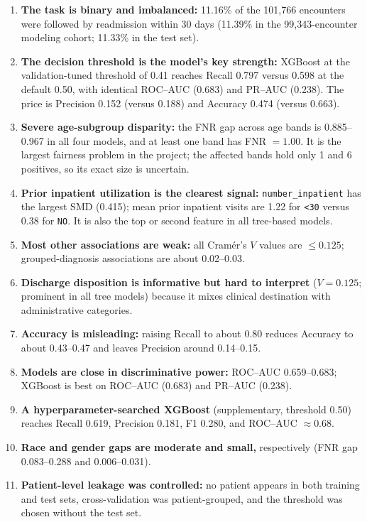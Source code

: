 \documentclass[10pt,a4paper]{article}
\begin{document}
\begin{enumerate}[leftmargin=1.2cm]
\item \textbf{The task is binary and imbalanced:} 11.16\% of the 101,766 encounters were followed by readmission within 30 days (11.39\% in the 99,343-encounter modeling cohort; 11.33\% in the test set).
\item \textbf{The decision threshold is the model's key strength:} XGBoost at the validation-tuned threshold of 0.41 reaches Recall 0.797 versus 0.598 at the default 0.50, with identical ROC--AUC (0.683) and PR--AUC (0.238). The price is Precision 0.152 (versus 0.188) and Accuracy 0.474 (versus 0.663).
\item \textbf{Severe age-subgroup disparity:} the FNR gap across age bands is 0.885--0.967 in all four models, and at least one band has FNR $=1.00$. It is the largest fairness problem in the project; the affected bands hold only 1 and 6 positives, so its exact size is uncertain.
\item \textbf{Prior inpatient utilization is the clearest signal:} \texttt{number\_inpatient} has the largest SMD (0.415); mean prior inpatient visits are 1.22 for \texttt{<30} versus 0.38 for \texttt{NO}. It is also the top or second feature in all tree-based models.
\item \textbf{Most other associations are weak:} all Cramér's $V$ values are $\le 0.125$; grouped-diagnosis associations are about 0.02--0.03.
\item \textbf{Discharge disposition is informative but hard to interpret} ($V=0.125$; prominent in all tree models) because it mixes clinical destination with administrative categories.
\item \textbf{Accuracy is misleading:} raising Recall to about 0.80 reduces Accuracy to about 0.43--0.47 and leaves Precision around 0.14--0.15.
\item \textbf{Models are close in discriminative power:} ROC--AUC 0.659--0.683; XGBoost is best on ROC--AUC (0.683) and PR--AUC (0.238).
\item \textbf{A hyperparameter-searched XGBoost} (supplementary, threshold 0.50) reaches Recall 0.619, Precision 0.181, F1 0.280, and ROC--AUC $\approx 0.68$.
\item \textbf{Race and gender gaps are moderate and small,} respectively (FNR gap 0.083--0.288 and 0.006--0.031).
\item \textbf{Patient-level leakage was controlled:} no patient appears in both training and test sets, cross-validation was patient-grouped, and the threshold was chosen without the test set.
\end{enumerate}
\end{document}
